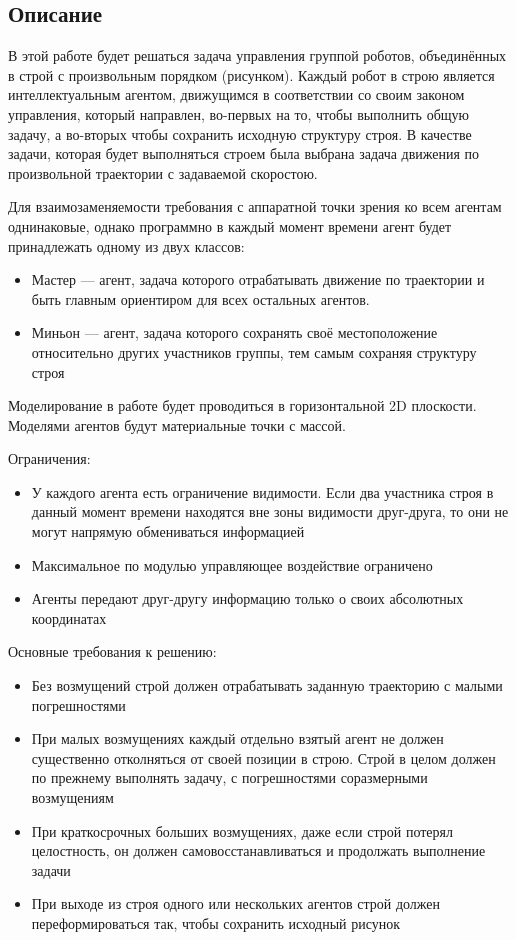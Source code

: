 \documentclass[12pt,a4paper]{article}
\begin{document}
\subsection{Описание}
В этой работе будет решаться задача управления группой роботов, объединённых в строй с произвольным порядком (рисунком). Каждый робот в строю является интеллектуальным агентом, движущимся в соответствии со своим законом управления, который направлен, во-первых на то, чтобы выполнить общую задачу, а во-вторых чтобы сохранить исходную структуру строя. В качестве задачи, которая будет выполняться строем была выбрана задача движения по произвольной траектории с задаваемой скоростою. \par
Для взаимозаменяемости требования с аппаратной точки зрения ко всем агентам однинаковые, однако программно в каждый момент времени агент будет принадлежать одному из двух классов:
\begin{itemize}
	\item Мастер — агент, задача которого отрабатывать движение по траектории и быть главным ориентиром для всех остальных агентов.
	\item Миньон — агент, задача которого сохранять своё местоположение относительно других участников группы, тем самым сохраняя структуру строя
\end{itemize}
\par
Моделирование в работе будет проводиться в горизонтальной 2D плоскости. Моделями агентов будут материальные точки с массой.
\par
Ограничения:
\begin{itemize}
	\item У каждого агента есть ограничение видимости. Если два участника строя в данный момент времени находятся вне зоны видимости друг-друга, то они не могут напрямую обмениваться информацией
	\item Максимальное по модулью управляющее воздействие ограничено
	\item Агенты передают друг-другу информацию только о своих абсолютных координатах
\end{itemize}
Основные требования к решению:
\begin{itemize}
	\item Без возмущений строй должен отрабатывать заданную траекторию с малыми погрешностями
	\item При малых возмущениях каждый отдельно взятый агент не должен существенно отколняться от своей позиции в строю. Строй в целом должен по прежнему выполнять задачу, с погрешностями соразмерными возмущениям
	\item При краткосрочных больших возмущениях, даже если строй потерял целостность, он должен самовосстанавливаться и продолжать выполнение задачи
	\item При выходе из строя одного или нескольких агентов строй должен переформироваться так, чтобы сохранить исходный рисунок
\end{itemize}
\end{document}
